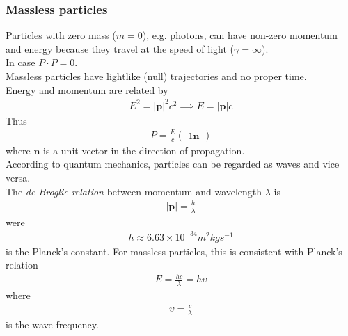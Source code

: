 \documentclass[a4paper]{article}
\begin{document}
\subsubsection{Massless particles}
Particles with zero mass ($m=0$), e.g. photons, can have non-zero momentum and energy because they travel at the speed of light ($\gamma = \infty$).\\
In case $P \cdot P = 0$.\\
Massless particles have lightlike (null) trajectories and no proper time.\\
Energy and momentum are related by
\begin{equation*}
\begin{aligned}
E^2 = |\mathbf{p}|^2 c^2 \implies E=|\mathbf{p}|c
\end{aligned}
\end{equation*}
Thus
\begin{equation*}
\begin{aligned}
P=\frac{E}{c}\left(
\begin{array}{ll}
1
\mathbf{n}
\end{array}\right)
\end{aligned}
\end{equation*}
where $\mathbf{n}$ is a unit vector in the direction of propagation.\\
According to quantum mechanics, particles can be regarded as waves and vice versa.\\
The \emph{de Broglie relation} between momentum and wavelength $\lambda$ is
\begin{equation*}
\begin{aligned}
|\mathbf{p}| = \frac{h}{\lambda}
\end{aligned}
\end{equation*}
were
\begin{equation*}
\begin{aligned}
h \approx 6.63\times 10^{-34} m^2 kg s^{-1}
\end{aligned}
\end{equation*}
is the Planck's constant. For massless particles, this is consistent with Planck's relation
\begin{equation*}
\begin{aligned}
E=\frac{hc}{\lambda} = h\upsilon
\end{aligned}
\end{equation*}
where
\begin{equation*}
\begin{aligned}
\upsilon = \frac{c}{\lambda}
\end{aligned}
\end{equation*}
is the wave frequency.
\end{document}
